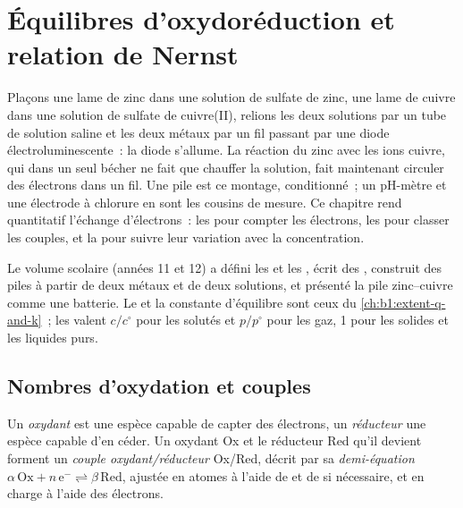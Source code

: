 \chapter{Équilibres d'oxydoréduction et relation de Nernst}\label{ch:b1:nernst}

Plaçons une lame de zinc dans une solution de sulfate de zinc, une lame
de cuivre dans une solution de sulfate de cuivre(II), relions les deux
solutions par un tube de solution saline et les deux métaux par un fil
passant par une diode électroluminescente~: la diode s'allume. La
réaction du zinc avec les ions cuivre, qui dans un seul bécher ne fait
que chauffer la solution, fait maintenant circuler des électrons dans un
fil. Une pile est ce montage, conditionné~; un pH-mètre et une électrode
à chlorure en sont les cousins de mesure. Ce chapitre rend quantitatif
l'échange d'électrons~: les  pour compter les
électrons, les  pour classer les couples, et la
 pour suivre leur variation avec la concentration.

\begin{recall}
Le volume scolaire (années 11 et 12) a défini les  et les
, écrit des , construit des piles à partir de
deux métaux et de deux solutions, et présenté la pile zinc--cuivre comme
une batterie. Le  et la constante d'équilibre sont
ceux du \cref{ch:b1:extent-q-and-k}~; les  valent $c/c^\circ$
pour les solutés et $p/p^\circ$ pour les gaz, 1 pour les solides et les
liquides purs.
\end{recall}

\section{Nombres d'oxydation et couples}

\begin{definition}\label{def:b1:nernst:couple}
Un \emph{oxydant} est une espèce capable de capter des
électrons, un \emph{réducteur} une espèce capable d'en céder. Un
oxydant Ox et le réducteur Red qu'il devient forment un \emph{couple
oxydant/réducteur} Ox/Red, décrit par sa
\emph{demi-équation}
$\alpha\,\mathrm{Ox} + n\,\mathrm{e^-} \rightleftharpoons
\beta\,\mathrm{Red}$, ajustée en atomes à l'aide de  et de
 si nécessaire, et en charge à l'aide des électrons.
\end{definition}

